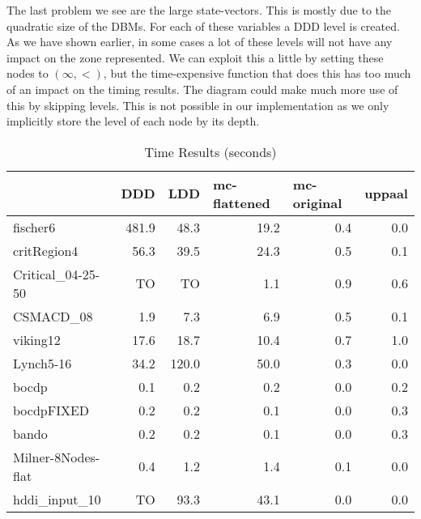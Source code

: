The last problem we see are the large state-vectors. This is mostly due to the quadratic size of the DBMs. For each of these variables a DDD level is created. As we have shown earlier, in some cases a lot of these levels will not have any impact on the zone represented. We can exploit this a little by setting these nodes to $(\infty,<)$, but the time-expensive function that does this has too much of an impact on the timing results. The diagram could make much more use of this by skipping levels. This is not possible in our implementation as we only implicitly store the level of each node by its depth. 

\begin{table}

    \begin{tabular}{|l|r|r|r|r|r|}
    \hline
                       & \multicolumn{1}{l|}{DDD}   & \multicolumn{1}{l|}{LDD}   & \multicolumn{1}{l|}{mc-flattened} & \multicolumn{1}{l|}{mc-original} & \multicolumn{1}{l|}{uppaal} \\ \hline
    fischer6           & 481.9 & 48.3  & 19.2         & 0.4         & 0.0    \\
    critRegion4        & 56.3  & 39.5  & 24.3         & 0.5         & 0.1    \\
    Critical\_04-25-50 & TO    & TO    & 1.1          & 0.9         & 0.6    \\
    CSMACD\_08         & 1.9   & 7.3   & 6.9          & 0.5         & 0.1    \\
    viking12           & 17.6  & 18.7  & 10.4         & 0.7         & 1.0    \\
    Lynch5-16          & 34.2  & 120.0 & 50.0         & 0.3         & 0.0    \\
    bocdp              & 0.1   & 0.2   & 0.2          & 0.0         & 0.2    \\
    bocdpFIXED         & 0.2   & 0.2   & 0.1          & 0.0         & 0.3    \\
    bando              & 0.2   & 0.2   & 0.1          & 0.0         & 0.3    \\
    Milner-8Nodes-flat & 0.4   & 1.2   & 1.4          & 0.1         & 0.0    \\
    hddi\_input\_10    & TO    & 93.3  & 43.1         & 0.0         & 0.0    \\ \hline
    \end{tabular}
\caption{Time Results (seconds)}
\label{tab:time_results}
\end{table}

